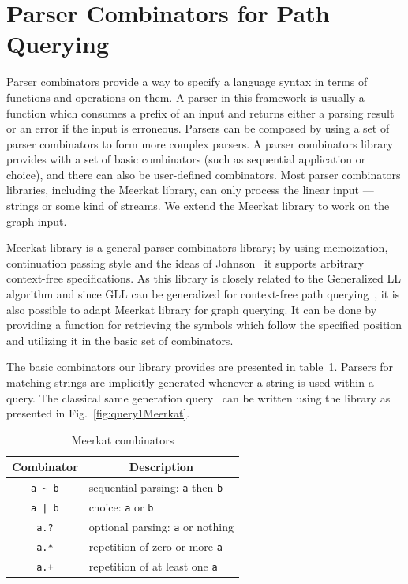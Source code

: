  \section{Parser Combinators for Path Querying}

Parser combinators provide a way to specify a language syntax in terms of functions and operations on them. 
A parser in this framework is usually a function which consumes a prefix of an input and returns either a parsing result or an error if the input is erroneous. 
Parsers can be composed by using a set of parser combinators to form more complex parsers. 
A parser combinators library provides with a set of basic combinators (such as sequential application or choice), and there can also be user-defined combinators. 
Most parser combinators libraries, including the Meerkat library, can only process the linear input --- strings or some kind of streams. 
We extend the Meerkat library to work on the graph input.

Meerkat library is a general parser combinators library; by using memoization, continuation passing style and the ideas of Johnson~\cite{Johnson} it supports arbitrary context-free specifications. 
As this library is closely related to the Generalized LL algorithm and since GLL can be generalized for context-free path querying~\cite{GrigorevR16}, it is also possible to adapt Meerkat library for graph querying. 
It can be done by providing a function for retrieving the symbols which follow the specified position and utilizing it in the basic set of combinators.

The basic combinators our library provides are presented in table~\ref{table:combinators}. 
Parsers for matching strings are implicitly generated whenever a string is used within a query. 
The classical same generation query~\cite{FndDB} can be written using the library as presented in Fig.~\ref{fig:query1Meerkat}.

\begin{table}[h]
\centering
\begin{tabular}{c|l}
\multicolumn{1}{c|}{Combinator} & \multicolumn{1}{|c}{Description} \\ \hline
{\lstinline!a ~ b!} & sequential parsing: {\lstinline!a!} then {\lstinline!b!}   \\
{\lstinline!a | b!} & choice: {\lstinline!a!} or {\lstinline!b!}         \\
{\lstinline!a.?!}   & optional parsing: {\lstinline!a!} or nothing   \\
{\lstinline!a.*!}   & repetition of zero or more {\lstinline!a!} \\
{\lstinline!a.+!}   & repetition of at least one {\lstinline!a!} \\
\end{tabular}
\caption{Meerkat combinators}
\label{table:combinators}
\end{table}


